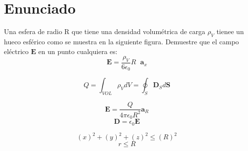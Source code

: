 \documentclass{article}
\begin{document}
  \section*{Enunciado}
  Una esfera de radio R  que tiene una densidad volumétrica de carga $\rho_V$
  tienee un hueco esférico como se muestra en la siguiente figura. Demuestre que
  el campo eléctrico $\textbf{E}$ en un punto cualquiera es:
  \begin{equation*}
    \textbf{E} = \frac{\rho_V}{6 \epsilon_0} R \phantom{\cdot} \textbf{a}_x
  \end{equation*}

  \begin{figure}[H]
    \centering
  \end{figure}

  \begin{equation}
    Q = \int_{VOL} \rho_V dV = \oint_S \textbf{D}_S d\textbf{S}
  \end{equation}

  \begin{equation}
    \textbf{E} = \frac{Q}{4\pi\epsilon_0R^2}\textbf{a}_R
  \end{equation}
  \begin{equation}
    \textbf{D} = \epsilon_0 \textbf{E}
  \end{equation}

  \begin{equation*}
    \tag{Volumen de la esfera grande}
    (x)^2+(y)^2+(z)^2 \leq (R)^2
  \end{equation*}
  \begin{equation*}
    r \leq R
  \end{equation*}
\end{document}
